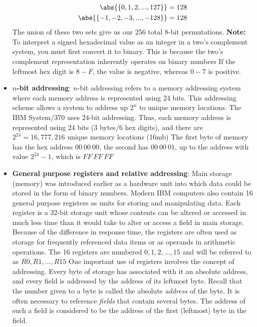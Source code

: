 \documentclass{report}
\begin{document}
\begin{itemize}
            \begin{align*}
                \abs{\{0,1,2,...,127\}} = 128 \\
                \abs{\{-1,-2,-3,...,-128\}} = 128
            \end{align*}
            The union of these two sets give us our 256 total 8-bit permutations.
            \bigbreak \noindent 
            \textbf{Note:} To interpret a signed hexadecimal value as an integer in a two's complement system, you must first convert it to binary. This is because the two's complement representation inherently operates on binary numbers
            \bigbreak \noindent 
            If the leftmost hex digit is $8-F$, the value is negative, whereas $0-7$  is positive.
        \item \textbf{$n$-bit addressing}: $n$-bit addressing refers to a memory addressing system where each memory address is represented using 24 bits. This addressing scheme allows a system to address up $2^{n}$ to unique memory locations.
            \bigbreak \noindent 
            The IBM System/370 uses 24-bit addressing. Thus, each memory address is represented using 24 bits (3 bytes/6 hex digits), and there are $2^{24} = 16,777,216$ unique memory locations (16mb)
            \bigbreak \noindent 
            The first byte of memory has the hex address $00 \ 00 \ 00$, the second has $00 \ 00 \ 01$, up to the address with value $2^{24}-1 $, which is $FF \ FF \ FF $
        \item \textbf{General purpose registers and relative addressing}: Main storage (memory) was introduced earlier as a hardware unit into which data could be stored in the form of binary numbers. Modern IBM computers also contain 16 general purpose registers as units for storing and manipulating data. Each register is a 32-bit storage unit whose contents can be altered or accessed in much less time than it would take to alter or access a field in main storage. Because of the difference in response time, the registers are often used as storage for frequently referenced data items or as operands in arithmetic operations.
            \bigbreak \noindent 
            The 16 registers are numbered $0,1,2,...,15$ and will be referred to as $R0, R1, ...,R15 $
            \bigbreak \noindent 
            One important use of registers involves the concept of addressing. Every byte of storage has associated with it an absolute address, and every field is addressed by the address of its leftmost byte. Recall that  the number given to a byte is called the absolute \textit{address} of the byte. It is often necessary to reference \textit{fields} that contain several bytes. The address of such a field is considered to be the address of the first (leftmost) byte in the field.

\end{itemize}
\end{document}
